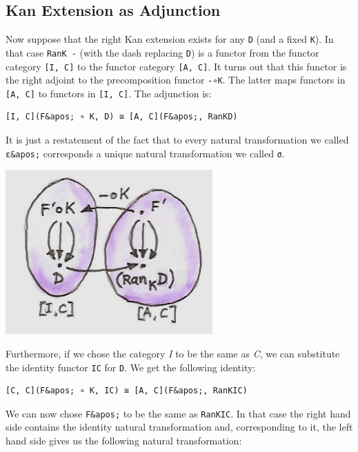 \subsection{Kan Extension as
Adjunction}\label{kan-extension-as-adjunction}

Now suppose that the right Kan extension exists for any \texttt{D} (and
a fixed \texttt{K}). In that case \texttt{RanK\ -} (with the dash
replacing \texttt{D}) is a functor from the functor category
\texttt{{[}I,\ C{]}} to the functor category \texttt{{[}A,\ C{]}}. It
turns out that this functor is the right adjoint to the precomposition
functor \texttt{-∘K}. The latter maps functors in \texttt{{[}A,\ C{]}}
to functors in \texttt{{[}I,\ C{]}}. The adjunction is:

\begin{verbatim}
[I, C](F&apos; ∘ K, D) ≅ [A, C](F&apos;, RanKD)
\end{verbatim}

It is just a restatement of the fact that to every natural
transformation we called \texttt{ε\&apos;} corresponds a unique natural
transformation we called \texttt{σ}.

\includegraphics[width=3.12500in]{images/kan92.jpg}

Furthermore, if we chose the category \emph{I} to be the same as
\emph{C}, we can substitute the identity functor \texttt{IC} for
\texttt{D}. We get the following identity:

\begin{verbatim}
[C, C](F&apos; ∘ K, IC) ≅ [A, C](F&apos;, RanKIC)
\end{verbatim}

We can now chose \texttt{F\&apos;} to be the same as \texttt{RanKIC}. In
that case the right hand side contains the identity natural
transformation and, corresponding to it, the left hand side gives us the
following natural transformation:

